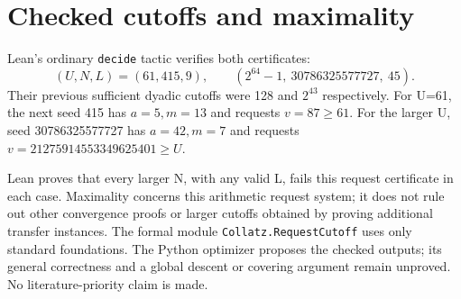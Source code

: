 \documentclass[10pt]{article}
\begin{document}
\section{Checked cutoffs and maximality}
Lean's ordinary \texttt{decide} tactic verifies both certificates:
\[
 (U,N,L)=(61,415,9),\qquad
 (2^{64}-1,\ 30786325577727,\ 45).
\]
Their previous sufficient dyadic cutoffs were 128 and $2^{43}$ respectively.
For U=61, the next seed 415 has $a=5,m=13$ and requests $v=87\ge61$. For the larger U, seed 30786325577727 has $a=42,m=7$ and requests $v=21275914553349625401\ge U$.

Lean proves that every larger N, with any valid L, fails this request certificate in each case. Maximality concerns this arithmetic request system; it does not rule out other convergence proofs or larger cutoffs obtained by proving additional transfer instances.
The formal module \texttt{Collatz.RequestCutoff} uses only standard foundations. The Python optimizer proposes the checked outputs; its general correctness and a global descent or covering argument remain unproved. No literature-priority claim is made.
\end{document}
